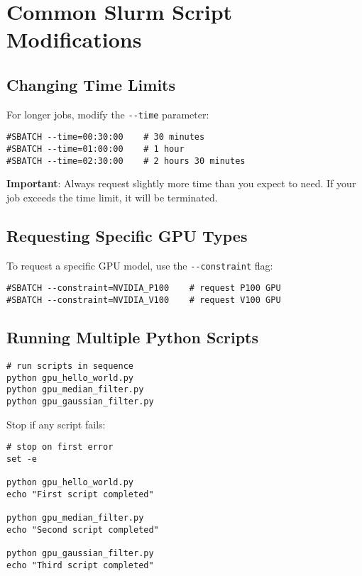 \documentclass[11pt, a4paper]{article}
\newcommand{\code}[1]{\texttt{#1}}
\begin{document}
\section*{Common Slurm Script Modifications}

\subsection*{Changing Time Limits}

For longer jobs, modify the \code{-{}-time} parameter:

\begin{lstlisting}
#SBATCH --time=00:30:00    # 30 minutes
#SBATCH --time=01:00:00    # 1 hour
#SBATCH --time=02:30:00    # 2 hours 30 minutes
\end{lstlisting}

\textbf{Important}: Always request slightly more time than you expect to need. If your job exceeds the time limit, it will be terminated.

\subsection*{Requesting Specific GPU Types}

To request a specific GPU model, use the \code{-{}-constraint} flag:

\begin{lstlisting}
#SBATCH --constraint=NVIDIA_P100    # request P100 GPU
#SBATCH --constraint=NVIDIA_V100    # request V100 GPU
\end{lstlisting}

\subsection*{Running Multiple Python Scripts}

\begin{lstlisting}
# run scripts in sequence
python gpu_hello_world.py
python gpu_median_filter.py
python gpu_gaussian_filter.py
\end{lstlisting}

Stop if any script fails:

\begin{lstlisting}
# stop on first error
set -e

python gpu_hello_world.py
echo "First script completed"

python gpu_median_filter.py
echo "Second script completed"

python gpu_gaussian_filter.py
echo "Third script completed"
\end{lstlisting}
\end{document}
